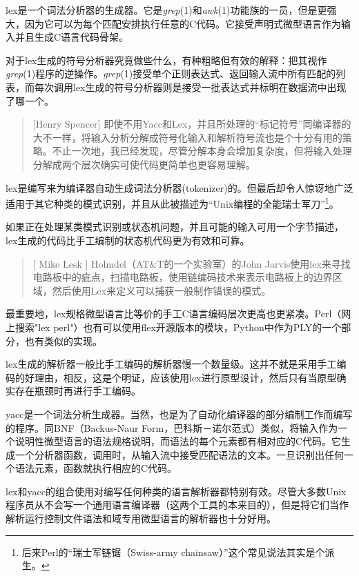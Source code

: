 \documentclass[12pt,oneside]{book}
\begin{document}
\begin{common-format}
lex是一个词法分析器的生成器。它是\textit{grep}(1)和\textit{awk}(1)功能族的一员，但是更强大，因为它可以为每个匹配安排执行任意的C代码。它接受声明式微型语言作为输入并且生成C语言代码骨架。

对于lex生成的符号分析器究竟做些什么，有种粗略但有效的解释：把其视作\textit{grep}(1)程序的逆操作。\textit{grep}(1)接受单个正则表达式、返回输入流中所有匹配的列表，而每次调用lex生成的符号分析器则是接受一批表达式并标明在数据流中出现了哪一个。

\begin{quote}[Henry Spencer]
即使不用Yacc和Lex，并且所处理的“标记符号”同编译器的大不一样，将输入分析分解成符号化输入和解析符号流也是个十分有用的策略。不止一次地，我已经发现，尽管分解本身会增加复杂度，但将输入处理分解成两个层次确实可使代码更简单也更容易理解。
\end{quote}

lex是编写来为编译器自动生成词法分析器(tokenizer)的。但最后却令人惊讶地广泛适用于其它种类的模式识别，并且从此被描述为“Unix编程的全能瑞士军刀”\footnote{后来Perl的“瑞士军链锯（Swiss-army chainsaw）”这个常见说法其实是个派生。}。

如果正在处理某类模式识别或状态机问题，并且可能的输入可用一个字节描述，lex生成的代码比手工编制的状态机代码更为有效和可靠。

\begin{quote}[ Mike Lesk 	]
Holmdel（AT\&{}T的一个实验室）的John Jarvis使用lex来寻找电路板中的疵点，扫描电路板，使用链编码技术来表示电路板上的边界区域，然后使用Lex来定义可以捕获一般制作错误的模式。
\end{quote}

最重要地，lex规格微型语言比等价的手工C语言编码层次更高也更紧凑。Perl（网上搜索"lex perl"）也有可以使用flex开源版本的模块，Python中作为PLY的一个部分，也有类似的实现。

lex生成的解析器一般比手工编码的解析器慢一个数量级。这并不就是采用手工编码的好理由，相反，这是个明证，应该使用lex进行原型设计，然后只有当原型确实存在瓶颈时再进行手工编码。

yacc是一个词法分析生成器。当然，也是为了自动化编译器的部分编制工作而编写的程序。同BNF（Backus-Naur Form，巴科斯－诺尔范式）类似，将输入作为一个说明性微型语言的语法规格说明，而语法的每个元素都有相对应的C代码。它生成一个分析器函数，调用时，从输入流中接受匹配语法的文本。一旦识别出任何一个语法元素，函数就执行相应的C代码。

lex和yacc的组合使用对编写任何种类的语言解析器都特别有效。尽管大多数Unix程序员从不会写一个通用语言编译器（这两个工具的本来目的），但是将它们当作解析运行控制文件语法和域专用微型语言的解析器也十分好用。


\end{common-format}
\end{document}
